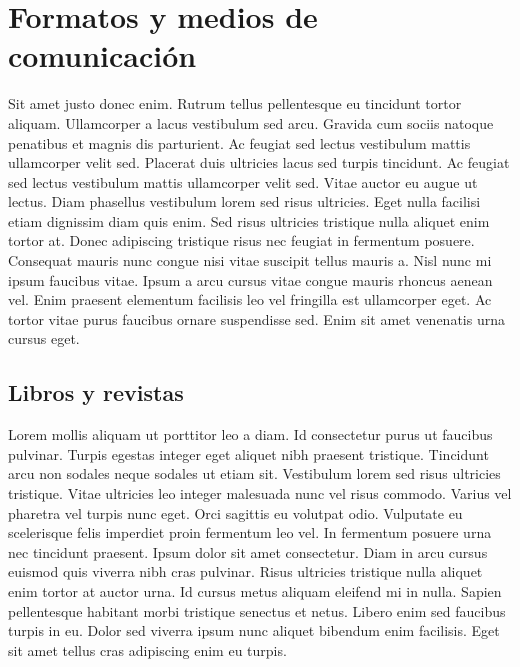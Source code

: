 \chapter{Formatos y medios de comunicación}
Sit amet justo donec enim. Rutrum tellus pellentesque eu tincidunt tortor aliquam. Ullamcorper a lacus vestibulum sed arcu. Gravida cum sociis natoque penatibus et magnis dis parturient. Ac feugiat sed lectus vestibulum mattis ullamcorper velit sed. Placerat duis ultricies lacus sed turpis tincidunt. Ac feugiat sed lectus vestibulum mattis ullamcorper velit sed. Vitae auctor eu augue ut lectus. Diam phasellus vestibulum lorem sed risus ultricies. Eget nulla facilisi etiam dignissim diam quis enim. Sed risus ultricies tristique nulla aliquet enim tortor at. Donec adipiscing tristique risus nec feugiat in fermentum posuere. Consequat mauris nunc congue nisi vitae suscipit tellus mauris a. Nisl nunc mi ipsum faucibus vitae. Ipsum a arcu cursus vitae congue mauris rhoncus aenean vel. Enim praesent elementum facilisis leo vel fringilla est ullamcorper eget. Ac tortor vitae purus faucibus ornare suspendisse sed. Enim sit amet venenatis urna cursus eget.

\section{Libros y revistas}
Lorem mollis aliquam ut porttitor leo a diam. Id consectetur purus ut faucibus pulvinar. Turpis egestas integer eget aliquet nibh praesent tristique. Tincidunt arcu non sodales neque sodales ut etiam sit. Vestibulum lorem sed risus ultricies tristique. Vitae ultricies leo integer malesuada nunc vel risus commodo. Varius vel pharetra vel turpis nunc eget. Orci sagittis eu volutpat odio. Vulputate eu scelerisque felis imperdiet proin fermentum leo vel. In fermentum posuere urna nec tincidunt praesent. Ipsum dolor sit amet consectetur. Diam in arcu cursus euismod quis viverra nibh cras pulvinar. Risus ultricies tristique nulla aliquet enim tortor at auctor urna. Id cursus metus aliquam eleifend mi in nulla. Sapien pellentesque habitant morbi tristique senectus et netus. Libero enim sed faucibus turpis in eu. Dolor sed viverra ipsum nunc aliquet bibendum enim facilisis. Eget sit amet tellus cras adipiscing enim eu turpis.

